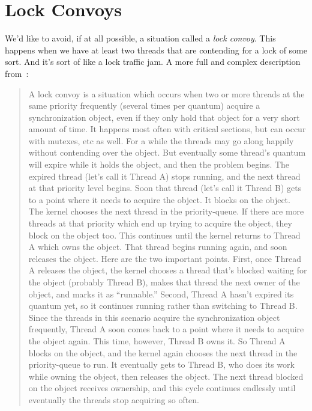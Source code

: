 




\section*{Lock Convoys}

We'd like to avoid, if at all possible, a situation called a \textit{lock convoy}. This happens when we have at least two threads that are contending for a lock of some sort. And it's sort of like a lock traffic jam. A more full and complex description from~\cite{lockconvoys}:

\begin{quote}
A lock convoy is a situation which occurs when two or more threads at the same priority frequently (several times per quantum) acquire a synchronization object, even if they only hold that object for a very short amount of time.  It happens most often with critical sections, but can occur with mutexes, etc as well.  For a while the threads may go along happily without contending over the object.  But eventually some thread's quantum will expire while it holds the object, and then the problem begins.  The expired thread (let's call it Thread A) stops running, and the next thread at that priority level begins.  Soon that thread (let's call it Thread B) gets to a point where it needs to acquire the object.  It blocks on the object.  The kernel chooses the next thread in the priority-queue.  If there are more threads at that priority which end up trying to acquire the object, they block on the object too.  This continues until the kernel returns to Thread A which owns the object.  That thread begins running again, and soon releases the object.  Here are the two important points.  First, once Thread A releases the object, the kernel chooses a thread that's blocked waiting for the object (probably Thread B), makes that thread the next owner of the object, and marks it as ``runnable.''  Second, Thread A hasn't expired its quantum yet, so it continues running rather than switching to Thread B.  Since the threads in this scenario acquire the synchronization object frequently, Thread A soon comes back to a point where it needs to acquire the object again.  This time, however, Thread B owns it.  So Thread A blocks on the object, and the kernel again chooses the next thread in the priority-queue to run.  It eventually gets to Thread B, who does its work while owning the object, then releases the object.  The next thread blocked on the object receives ownership, and this cycle continues endlessly until eventually the threads stop acquiring so often.
\end{quote}

